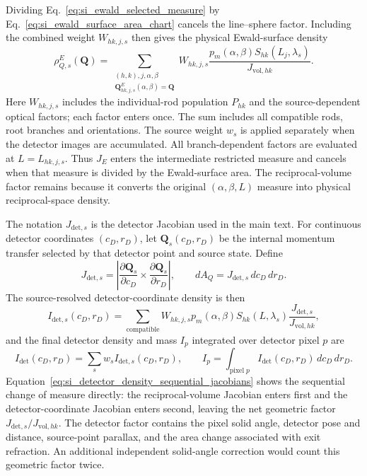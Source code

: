 Dividing Eq.~\eqref{eq:si_ewald_selected_measure} by Eq.~\eqref{eq:si_ewald_surface_area_chart} cancels the line--sphere factor. Including the combined weight $W_{hk,j,s}$ then gives the physical Ewald-surface density
\begin{equation}
  \rho_{Q,s}^{E}(\mathbf Q)
  =\sum_{\substack{(h,k),j,\alpha,\beta\\
  \mathbf Q^{E}_{hk,j,s}(\alpha,\beta)=\mathbf Q}}
  W_{hk,j,s}
  \frac{p_m(\alpha,\beta)S_{hk}(L_j,\lambda_s)}
       {J_{\mathrm{vol},hk}}.
  \label{eq:si_ewald_surface_density_explicit}
\end{equation}
Here $W_{hk,j,s}$ includes the individual-rod population $P_{hk}$ and the source-dependent optical factors; each factor enters once. The sum includes all compatible rods, root branches and orientations. The source weight $w_s$ is applied separately when the detector images are accumulated. All branch-dependent factors are evaluated at $L=L_{hk,j,s}$. Thus $J_E$ enters the intermediate restricted measure and cancels when that measure is divided by the Ewald-surface area. The reciprocal-volume factor remains because it converts the original $(\alpha,\beta,L)$ measure into physical reciprocal-space density.

The notation $J_{\mathrm{det},s}$ is the detector Jacobian used in the main text. For continuous detector coordinates $(c_D,r_D)$, let $\mathbf Q_s(c_D,r_D)$ be the internal momentum transfer selected by that detector point and source state. Define
\begin{equation}
  J_{\mathrm{det},s}
  =\left|
  \frac{\partial\mathbf Q_s}{\partial c_D}
  \times
  \frac{\partial\mathbf Q_s}{\partial r_D}
  \right|,
  \qquad
  dA_Q=J_{\mathrm{det},s}\,dc_D\,dr_D.
  \label{eq:si_detector_surface_jacobian}
\end{equation}
The source-resolved detector-coordinate density is then
\begin{equation}
  I_{\mathrm{det},s}(c_D,r_D)
  =\sum_{\mathrm{compatible}}
  W_{hk,j,s}
  p_m(\alpha,\beta)S_{hk}(L,\lambda_s)
  \frac{J_{\mathrm{det},s}}{J_{\mathrm{vol},hk}},
  \label{eq:si_detector_density_sequential_jacobians}
\end{equation}
and the final detector density and mass $I_p$ integrated over detector pixel $p$ are
\begin{equation}
  I_{\mathrm{det}}(c_D,r_D)=\sum_s w_sI_{\mathrm{det},s}(c_D,r_D),
  \qquad
  I_p=\int_{\mathrm{pixel}\;p}I_{\mathrm{det}}(c_D,r_D)\,dc_D\,dr_D.
  \label{eq:si_source_sum_and_pixel_mass}
\end{equation}
Equation~\eqref{eq:si_detector_density_sequential_jacobians} shows the sequential change of measure directly: the reciprocal-volume Jacobian enters first and the detector-coordinate Jacobian enters second, leaving the net geometric factor $J_{\mathrm{det},s}/J_{\mathrm{vol},hk}$. The detector factor contains the pixel solid angle, detector pose and distance, source-point parallax, and the area change associated with exit refraction. An additional independent solid-angle correction would count this geometric factor twice.

